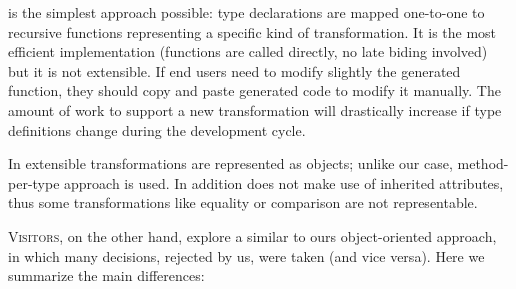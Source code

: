  is the simplest approach possible: type declarations are mapped one-to-one to recursive functions representing a specific kind of
transformation. It is the most efficient implementation (functions are called directly, no late biding involved) but it is not extensible. If end users
need to modify slightly the generated function, they should copy and paste generated code to modify it manually. The amount of work to support a new
transformation will drastically increase if type definitions change during the development cycle.

In  extensible transformations are represented as objects; unlike our case, method-per-type approach is used. In addition 
 does not make use of inherited attributes, thus some transformations like equality or comparison are not representable.

\textsc{Visitors}, on the other hand, explore a similar to ours object-oriented approach, in which many decisions, rejected by us, were taken (and vice versa). Here
we summarize the main differences:

